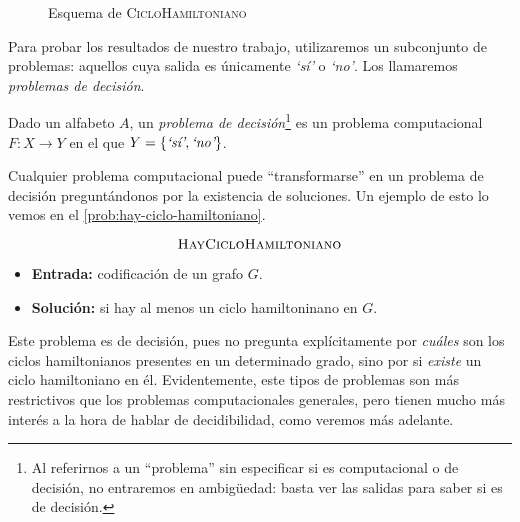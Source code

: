 \begin{figure}[H]
\centering
\vspace*{8pt}

\caption{Esquema de \textsc{CicloHamiltoniano}}
\label{fig:esquema-ciclohamiltoniano}
\end{figure}

Para probar los resultados de nuestro trabajo, utilizaremos un subconjunto de problemas: aquellos cuya salida es únicamente \emph{`sí'} o \emph{`no'}. Los llamaremos \emph{problemas de decisión}.

\begin{definicion}\label{def:problema-decision}
Dado un alfabeto $A$, un \emph{problema de decisión}\footnote{Al referirnos a un ``problema'' sin especificar si es computacional o de decisión, no entraremos en ambigüedad: basta ver las salidas para saber si es de decisión.} es un problema computacional $F:X\longrightarrow Y$ en el que $Y = \{\emph{`sí'}, \emph{`no'}\}$.
\end{definicion}

Cualquier problema computacional puede ``transformarse'' en un problema de decisión preguntándonos por la existencia de soluciones. Un ejemplo de esto lo vemos en el \cref{prob:hay-ciclo-hamiltoniano}.

\vspace{8pt}
\begin{problema}
\begin{framed}
$$\text{\textsc{HayCicloHamiltoniano}}$$

\begin{itemize}
    \item \textbf{Entrada:} codificación de un grafo $G$.
    \item \textbf{Solución:} si hay al menos un ciclo hamiltoninano en $G$.
\end{itemize}
\end{framed}
\caption{\textsc{HayCicloHamiltoniano}}
\label{prob:hay-ciclo-hamiltoniano}
\end{problema}

Este problema es de decisión, pues no pregunta explícitamente por \emph{cuáles} son los ciclos hamiltonianos presentes en un determinado grado, sino por si \emph{existe} un ciclo hamiltoniano en él. Evidentemente, este tipos de problemas son más restrictivos que los problemas computacionales generales, pero tienen mucho más interés a la hora de hablar de decidibilidad, como veremos más adelante.

